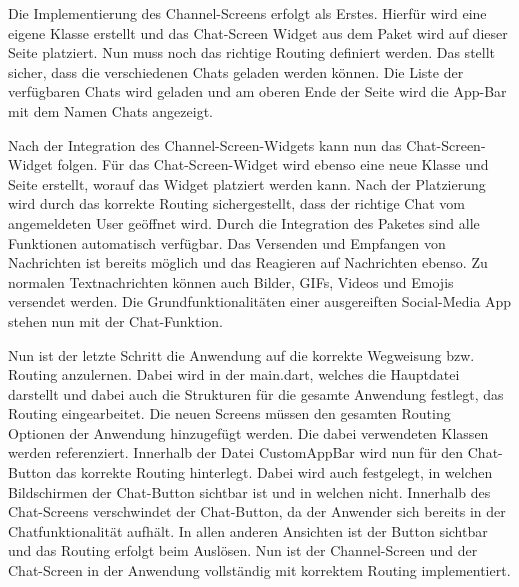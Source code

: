 \noindent
Die Implementierung des Channel-Screens erfolgt als Erstes. Hierfür wird eine eigene Klasse erstellt und das Chat-Screen Widget aus dem Paket wird auf dieser Seite platziert. Nun muss noch das richtige Routing definiert werden. Das stellt sicher, dass die verschiedenen Chats geladen werden können. Die Liste der verfügbaren Chats wird geladen und am oberen Ende der Seite wird die App-Bar mit dem Namen Chats angezeigt.

\noindent
Nach der Integration des Channel-Screen-Widgets kann nun das Chat-Screen-Widget folgen. Für das Chat-Screen-Widget wird ebenso eine neue Klasse und Seite erstellt, worauf das Widget platziert werden kann. Nach der Platzierung wird durch das korrekte Routing sichergestellt, dass der richtige Chat vom angemeldeten User geöffnet wird. Durch die Integration des Paketes sind alle Funktionen automatisch verfügbar. Das Versenden und Empfangen von Nachrichten ist bereits möglich und das Reagieren auf Nachrichten ebenso. Zu normalen Textnachrichten können auch Bilder, GIFs, Videos und Emojis versendet werden. Die Grundfunktionalitäten einer ausgereiften Social-Media App stehen nun mit der Chat-Funktion.

\noindent
Nun ist der letzte Schritt die Anwendung auf die korrekte Wegweisung bzw. Routing anzulernen. Dabei wird in der main.dart, welches die Hauptdatei darstellt und dabei auch die Strukturen für die gesamte Anwendung festlegt, das Routing eingearbeitet. Die neuen Screens müssen den gesamten Routing Optionen der Anwendung hinzugefügt werden. Die dabei verwendeten Klassen werden referenziert. Innerhalb der Datei CustomAppBar wird nun für den Chat-Button das korrekte Routing hinterlegt. Dabei wird auch festgelegt, in welchen Bildschirmen der Chat-Button sichtbar ist und in welchen nicht. Innerhalb des Chat-Screens verschwindet der Chat-Button, da der Anwender sich bereits in der Chatfunktionalität aufhält. In allen anderen Ansichten ist der Button sichtbar und das Routing erfolgt beim Auslösen. Nun ist der Channel-Screen und der Chat-Screen in der Anwendung vollständig mit korrektem Routing implementiert.